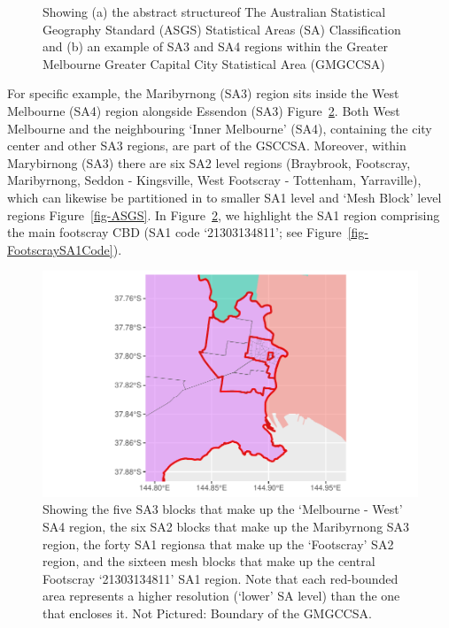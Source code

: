 \documentclass[
  letterpaper,
  DIV=11,
  numbers=noendperiod]{scrreprt}
\begin{document}
\begin{figure}
\begin{minipage}[t]{0.50\linewidth}
{\begin{figure}
{}

\end{figure}

}

\end{minipage}%

\caption{\label{fig-ASGSSA}Showing (a) the abstract structureof The
Australian Statistical Geography Standard (ASGS) Statistical Areas (SA)
Classification and (b) an example of SA3 and SA4 regions within the
Greater Melbourne Greater Capital City Statistical Area (GMGCCSA)}

\end{figure}

For specific example, the Maribyrnong (SA3) region sits inside the West
Melbourne (SA4) region alongside Essendon (SA3)
Figure~\ref{fig-FootscraySAexample}. Both West Melbourne and the
neighbouring `Inner Melbourne' (SA4), containing the city center and
other SA3 regions, are part of the GSCCSA. Moreover, within Marybirnong
(SA3) there are six SA2 level regions (Braybrook, Footscray,
Maribyrnong, Seddon - Kingsville, West Footscray - Tottenham,
Yarraville), which can likewise be partitioned in to smaller SA1 level
and `Mesh Block' level regions Figure~\ref{fig-ASGS}. In
Figure~\ref{fig-FootscraySAexample}, we highlight the SA1 region
comprising the main footscray CBD (SA1 code `21303134811'; see
Figure~\ref{fig-FootscraySA1Code}).

\begin{figure}

{\centering \includegraphics{03-CurrentStudy_files/figure-pdf/fig-FootscraySAexample-1.pdf}

}

\caption{\label{fig-FootscraySAexample}Showing the five SA3 blocks that
make up the `Melbourne - West' SA4 region, the six SA2 blocks that make
up the Maribyrnong SA3 region, the forty SA1 regionsa that make up the
`Footscray' SA2 region, and the sixteen mesh blocks that make up the
central Footscray `21303134811' SA1 region. Note that each red-bounded
area represents a higher resolution (`lower' SA level) than the one that
encloses it. Not Pictured: Boundary of the GMGCCSA.}

\end{figure}
\end{document}
